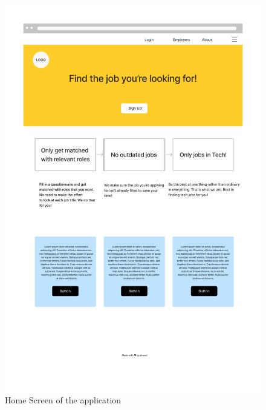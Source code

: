 \begin{figure}
    \noindent
    \centering
    \includegraphics[width = 140mm]{Figures/homescreen.pdf}
    \decoRule
    \caption[Home Screen of the application]{Home Screen of the application}
    \label{fig: Home Screen}
\end{figure}

